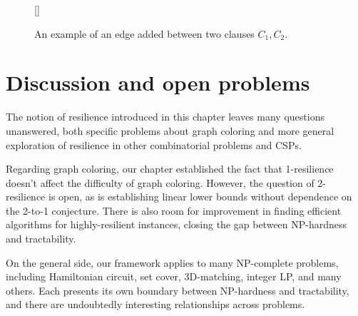 \begin{figure}
[\FBwidth]
{\caption{An example of an edge added between two clauses $C_1,
C_2$.}\label{fig:clause-clause-example}}
{}
\end{figure}


\section{Discussion and open problems} \label{sec:open-problems}

The notion of resilience introduced in this chapter leaves many questions
unanswered, both specific problems about graph coloring and more general
exploration of resilience in other combinatorial problems and CSPs. 

Regarding graph coloring, our chapter established the fact that 1-resilience
doesn't affect the difficulty of graph coloring. However, the question of
2-resilience is open, as is establishing linear lower bounds without dependence
on the 2-to-1 conjecture. There is also  room for improvement in finding
efficient algorithms for highly-resilient instances, closing the gap between
NP-hardness and tractability.

On the general side, our framework applies to many NP-complete problems,
including Hamiltonian circuit, set cover, 3D-matching, integer LP, and many
others. Each presents its own boundary between NP-hardness and tractability,
and there are undoubtedly interesting relationships across problems.\\

